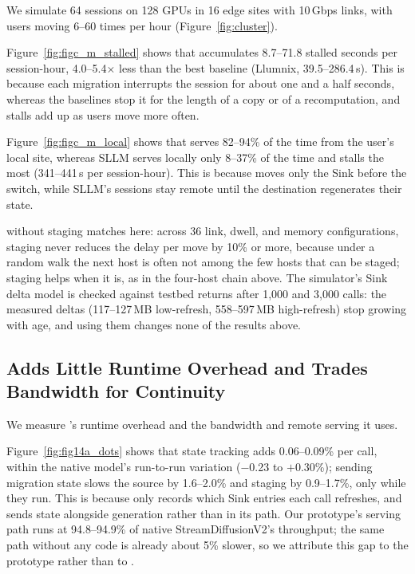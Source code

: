 \noindent We simulate 64 sessions on 128 GPUs in 16 edge sites with 10\,Gbps links, with users moving 6--60 times per
hour (Figure~\ref{fig:cluster}).

Figure~\ref{fig:figc_m_stalled} shows that \sys accumulates 8.7--71.8 stalled seconds per session-hour,
4.0--5.4$\times$ less than the best baseline (Llumnix, 39.5--286.4\,s).
This is because each \sys migration interrupts the session for about one and a half seconds, whereas the baselines
stop it for the length of a copy or of a recomputation, and stalls add up as users move more often.

Figure~\ref{fig:figc_m_local} shows that \sys serves 82--94\% of the time from the user's local site, whereas SLLM
serves locally only 8--37\% of the time and stalls the most (341--441\,s per session-hour).
This is because \sys moves only the Sink before the switch, while SLLM's sessions stay remote until the destination
regenerates their state.

\sys without staging matches \sys here: across 36 link, dwell, and memory configurations, staging never reduces the
delay per move by 10\% or more, because under a random walk the next host is often not among the few hosts that can
be staged; staging helps when it is, as in the four-host chain above.
The simulator's Sink delta model is checked against testbed returns after 1,000 and 3,000 calls: the measured deltas
(117--127\,MB low-refresh, 558--597\,MB high-refresh) stop growing with age, and using them changes none of the results
above.

\subsection{\sys Adds Little Runtime Overhead and Trades Bandwidth for Continuity}
\label{subsec:eval_overhead}

\noindent We measure \sys's runtime overhead and the bandwidth and remote serving it uses.

Figure~\ref{fig:fig14a_dots} shows that state tracking adds 0.06--0.09\% per call, within the native model's
run-to-run variation ($-$0.23 to $+$0.30\%); sending migration state slows the source by 1.6--2.0\% and staging by
0.9--1.7\%, only while they run.
This is because \sys only records which Sink entries each call refreshes, and sends state alongside generation
rather than in its path.
Our prototype's serving path runs at 94.8--94.9\% of native StreamDiffusionV2's throughput; the same path without any
\sys code is already about 5\% slower, so we attribute this gap to the prototype rather than to \sys.

